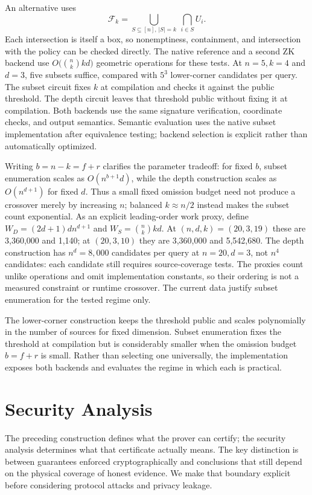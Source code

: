 \documentclass[preprint,review,12pt]{elsarticle}
\newcommand{\F}{\mathcal{F}_k}
\begin{document}
An alternative uses
\begin{equation}
 \F=\bigcup_{S\subseteq[n],\,|S|=k}\ \bigcap_{i\in S}U_i.
\end{equation}
Each intersection is itself a box, so nonemptiness, containment, and intersection with the policy can be checked directly. The native reference and a second ZK backend use $O\bigl(\binom nk kd\bigr)$ geometric operations for these tests. At $n=5,k=4$ and $d=3$, five subsets suffice, compared with $5^3$ lower-corner candidates per query. The subset circuit fixes $k$ at compilation and checks it against the public threshold. The depth circuit leaves that threshold public without fixing it at compilation. Both backends use the same signature verification, coordinate checks, and output semantics. Semantic evaluation uses the native subset implementation after equivalence testing; backend selection is explicit rather than automatically optimized.

Writing $b=n-k=f+r$ clarifies the parameter tradeoff: for fixed $b$, subset enumeration scales as $O(n^{b+1}d)$, while the depth construction scales as $O(n^{d+1})$ for fixed $d$. Thus a small fixed omission budget need not produce a crossover merely by increasing $n$; balanced $k\approx n/2$ instead makes the subset count exponential. As an explicit leading-order work proxy, define $W_D=(2d+1)dn^{d+1}$ and $W_S=\binom nk kd$. At $(n,d,k)=(20,3,19)$ these are 3,360,000 and 1,140; at $(20,3,10)$ they are 3,360,000 and 5,542,680. The depth construction has $n^d=8,000$ candidates per query at $n=20,d=3$, not $n^4$ candidates: each candidate still requires source-coverage tests. The proxies count unlike operations and omit implementation constants, so their ordering is not a measured constraint or runtime crossover. The current data justify subset enumeration for the tested regime only.

The lower-corner construction keeps the threshold public and scales polynomially in the number of sources for fixed dimension. Subset enumeration fixes the threshold at compilation but is considerably smaller when the omission budget $b=f+r$ is small. Rather than selecting one universally, the implementation exposes both backends and evaluates the regime in which each is practical.
\section{Security Analysis}\label{sec:security}
The preceding construction defines what the prover can certify; the security analysis determines what that certificate actually means. The key distinction is between guarantees enforced cryptographically and conclusions that still depend on the physical coverage of honest evidence. We make that boundary explicit before considering protocol attacks and privacy leakage.
\end{document}
